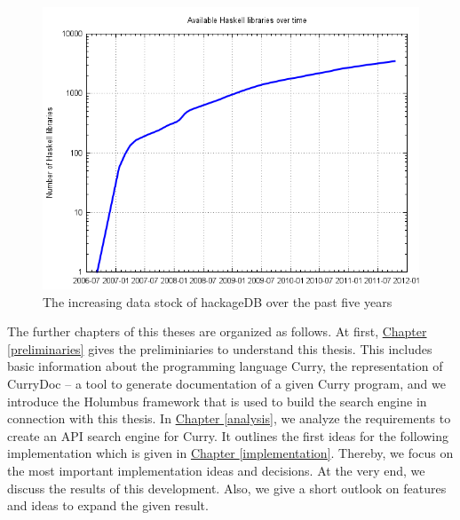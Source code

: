 \documentclass[%
	latex,%
	a4paper,%
	oneside,%
	chapterprefix,%
	headsepline,%
	12pt%
]{scrbook}
\begin{document}
\begin{figure}[h]
\begin{center}
\includegraphics[width=12.5cm]{bilder/hackage.png}
\end{center}
\caption{The increasing data stock of hackageDB over the past five years}
\end{figure}






The further chapters of this theses are organized as follows. %
At first, \hyperref[preliminaries]{Chapter \ref*{preliminaries}} gives
the preliminiaries to understand this thesis. %
This includes basic information about the programming language Curry,
the representation of CurryDoc -- a tool to generate documentation of
a given Curry program,
and we introduce the Holumbus framework that is used to build the
search engine in connection with this thesis. %
In \hyperref[analysis]{Chapter \ref*{analysis}}, we analyze the
requirements to create an API search engine for Curry. %
It outlines the first ideas for the following implementation which is
given in \hyperref[implementation]{Chapter \ref*{implementation}}. %
Thereby, we focus on the most important implementation ideas and
decisions. %
At the very end, we discuss the results of this development. %
Also, we give a short outlook on features and ideas to expand the
given result. %
\end{document}
